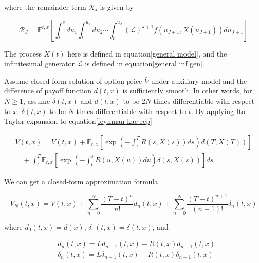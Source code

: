 \noindent where the remainder term $\mathcal{R}_{J}$ is given by

\begin{equation}
    \mathcal{R}_{J}=\mathbb{E}^{t, x}\left[\int_{t}^{s} d u_{1} \int_{t}^{u_{1}} d u_{2} \cdots \int_{t}^{u_{J}}\left(\mathcal{L}\right)^{J+1} f\left(u_{J+1}, X\left(u_{J+1}\right)\right) d u_{J+1}\right]
\end{equation}

The process $X(t)$ here is defined in equation\eqref{general model}, and the infinitesimal generator $\mathcal{L}$ is defined in equation\eqref{general inf gen}.

Assume closed form solution of option price $\bar{V}$ under auxiliary model and the difference of payoff function $d(t,x)$ is sufficiently smooth. In other words, for $N \geq 1$, assume $\delta(t,x)$ and $d(t,x)$ to be $2N$ times differentiable with respect to $x$, $\delta(t,x)$ to be $N$ times differentiable with respect to $t$. By applying Ito-Taylor expansion to equation\eqref{feynman-kac rep}

\begin{equation}
    \begin{gathered}
        V(t, x)=\bar{V}(t,x)+\mathbb{E}_{t,x}\left[\exp \left(-\int_{t}^{T} R(s,X(s)) d s\right) d(T,X(T))\right] \\
        \quad+\int_{t}^{T} \mathbb{E}_{t,x}\left[\exp \left(-\int_{t}^{s} R(u, X(u)) d u\right) \delta(s,X(s))\right] d s
        \end{gathered}
\end{equation}

\noindent We can get a closed-form approximation formula

\begin{equation}\label{approx formula}
    V_{N}(t, x)=\bar{V}(t,x)+\sum_{n=0}^{N} \frac{(T-t)^{n}}{n !} d_{n}(t, x)+\sum_{n=0}^{N} \frac{(T-t)^{n+1}}{(n+1) !} \delta_{n}(t, x)
\end{equation}

\noindent where $d_0(t,x)=d(x)$, $\delta_0(t,x)=\delta(t,x)$, and

\begin{equation}
    \begin{aligned}
        &d_{n}(t, x)=L d_{n-1}(t, x)-R(t, x) d_{n-1}(t, x) \\
        &\delta_{n}(t, x)=L \delta_{n-1}(t, x)-R(t, x) \delta_{n-1}(t, x)
        \end{aligned}
\end{equation}

